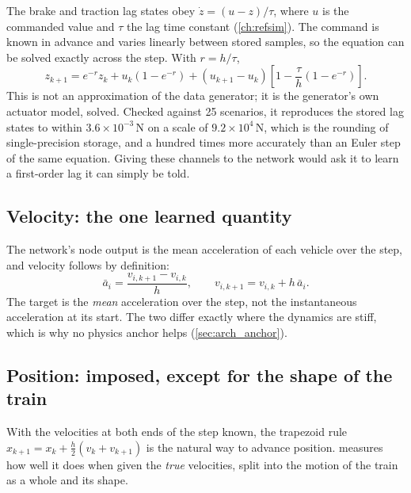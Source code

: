 The brake and traction lag states obey $\dot z = (u - z)/\tau$, where $u$ is the commanded value and $\tau$ the lag time constant (\cref{ch:refsim}). The command is known in advance and varies linearly between stored samples, so the equation can be solved exactly across the step. With $r = h/\tau$,
\begin{equation}
    z_{k+1} = e^{-r} z_k + u_k\left(1 - e^{-r}\right) + \left(u_{k+1} - u_k\right)\left[1 - \frac{\tau}{h}\left(1 - e^{-r}\right)\right] .
    \label{eq:arch_actuator_exact}
\end{equation}
This is not an approximation of the data generator; it is the generator's own actuator model, solved. Checked against 25 scenarios, it reproduces the stored lag states to within $3.6\times10^{-3}$\,N on a scale of $9.2\times10^{4}$\,N, which is the rounding of single-precision storage, and a hundred times more accurately than an Euler step of the same equation. Giving these channels to the network would ask it to learn a first-order lag it can simply be told.

\subsection{Velocity: the one learned quantity}

The network's node output is the mean acceleration of each vehicle over the step, and velocity follows by definition:
\begin{equation}
    \bar a_i = \frac{v_{i,k+1} - v_{i,k}}{h}, \qquad v_{i,k+1} = v_{i,k} + h\,\bar a_i .
    \label{eq:arch_velocity}
\end{equation}
The target is the \emph{mean} acceleration over the step, not the instantaneous acceleration at its start. The two differ exactly where the dynamics are stiff, which is why no physics anchor helps (\cref{sec:arch_anchor}).

\subsection{Position: imposed, except for the shape of the train}

With the velocities at both ends of the step known, the trapezoid rule $x_{k+1} = x_k + \tfrac{h}{2}(v_k + v_{k+1})$ is the natural way to advance position.  measures how well it does when given the \emph{true} velocities, split into the motion of the train as a whole and its shape.

